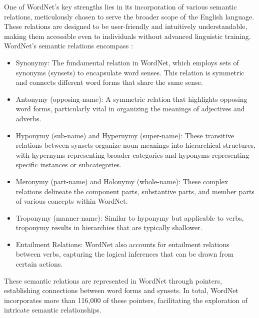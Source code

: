 One of WordNet's key strengths lies in its incorporation of various semantic relations, meticulously chosen to serve the broader scope of the English language. These relations are designed to be user-friendly and intuitively understandable, making them accessible even to individuals without advanced linguistic training. WordNet's semantic relations encompass \cite{miller1995wordnet}:
\begin{itemize}
\item Synonymy: The fundamental relation in WordNet, which employs sets of synonyms (synsets) to encapsulate word senses. This relation is symmetric and connects different word forms that share the same sense.
\item Antonymy (opposing-name): A symmetric relation that highlights opposing word forms, particularly vital in organizing the meanings of adjectives and adverbs.
\item Hyponymy (sub-name) and Hypernymy (super-name): These transitive relations between synsets organize noun meanings into hierarchical structures, with hypernyms representing broader categories and hyponyms representing specific instances or subcategories.
\item Meronymy (part-name) and Holonymy (whole-name): These complex relations delineate the component parts, substantive parts, and member parts of various concepts within WordNet.
\item Troponymy (manner-name): Similar to hyponymy but applicable to verbs, troponymy results in hierarchies that are typically shallower.
\item Entailment Relations: WordNet also accounts for entailment relations between verbs, capturing the logical inferences that can be drawn from certain actions.
\end{itemize}
These semantic relations are represented in WordNet through pointers, establishing connections between word forms and synsets. In total, WordNet incorporates more than 116,000 of these pointers, facilitating the exploration of intricate semantic relationships.
